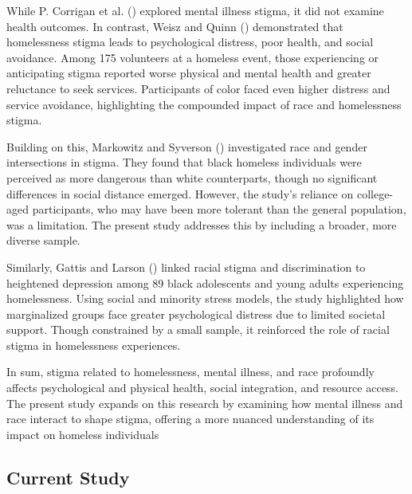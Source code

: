 \documentclass[
  man,
  floatsintext,
  longtable,
  nolmodern,
  notxfonts,
  notimes,
  colorlinks=true,linkcolor=blue,citecolor=blue,urlcolor=blue]{apa7}
\begin{document}
While P. Corrigan et al.
() explored
mental illness stigma, it did not examine health outcomes. In contrast,
Weisz and Quinn
()
demonstrated that homelessness stigma leads to psychological distress,
poor health, and social avoidance. Among 175 volunteers at a homeless
event, those experiencing or anticipating stigma reported worse physical
and mental health and greater reluctance to seek services. Participants
of color faced even higher distress and service avoidance, highlighting
the compounded impact of race and homelessness stigma.

Building on this, Markowitz and Syverson
() investigated
race and gender intersections in stigma. They found that black homeless
individuals were perceived as more dangerous than white counterparts,
though no significant differences in social distance emerged. However,
the study's reliance on college-aged participants, who may have been
more tolerant than the general population, was a limitation. The present
study addresses this by including a broader, more diverse sample.

Similarly, Gattis and Larson
() linked racial
stigma and discrimination to heightened depression among 89 black
adolescents and young adults experiencing homelessness. Using social and
minority stress models, the study highlighted how marginalized groups
face greater psychological distress due to limited societal support.
Though constrained by a small sample, it reinforced the role of racial
stigma in homelessness experiences.

In sum, stigma related to homelessness, mental illness, and race
profoundly affects psychological and physical health, social
integration, and resource access. The present study expands on this
research by examining how mental illness and race interact to shape
stigma, offering a more nuanced understanding of its impact on homeless
individuals

\subsection{Current Study}\label{current-study}
\end{document}
